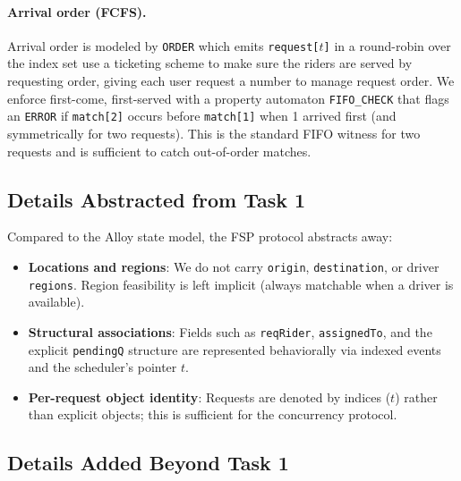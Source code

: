 \documentclass[11pt]{article}
\begin{document}
\paragraph{Arrival order (FCFS).}
Arrival order is modeled by \texttt{ORDER} which emits \texttt{request[$t$]} in a round-robin over the index set use a ticketing scheme to make sure the riders are served by requesting order, giving each user request a number to manage request order.
We enforce first-come, first-served with a property automaton \texttt{FIFO\_CHECK} that flags an \texttt{ERROR}
if \texttt{match[2]} occurs before \texttt{match[1]} when 1 arrived first (and symmetrically for two requests).
This is the standard FIFO witness for two requests and is sufficient to catch out-of-order matches.

\subsection{Details Abstracted from Task 1}

Compared to the Alloy state model, the FSP protocol abstracts away:
\begin{itemize}[leftmargin=1.5em]
  \item \textbf{Locations and regions}: We do not carry \texttt{origin}, \texttt{destination}, or driver \texttt{regions}. Region feasibility is left implicit (always matchable when a driver is available).
  \item \textbf{Structural associations}: Fields such as \texttt{reqRider}, \texttt{assignedTo}, and the explicit \texttt{pendingQ} structure are represented behaviorally via indexed events and the scheduler’s pointer $t$.
  \item \textbf{Per-request object identity}: Requests are denoted by indices ($t$) rather than explicit objects; this is sufficient for the concurrency protocol.
\end{itemize}

\subsection{Details Added Beyond Task 1}
\end{document}
